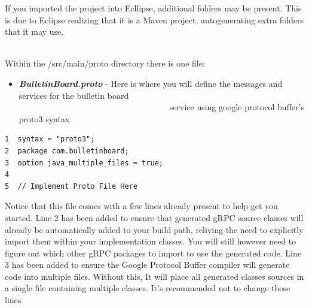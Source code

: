 \documentclass{article}
\begin{document}
\begin{info}[Notice:]
If you imported the project into Ecllipse, additional folders may be present. This is due to Eclipse realizing that it is a Maven project, autogenerating extra folders that it may use.
\end{info}

\-\ \\Within the /src/main/proto directory there is one file:
\begin{itemize}
\item \textbf{\textit{BulletinBoard.proto}} - Here is where you will define the messages and services for the bulletin board\\  
\-\ \-\ \-\ \-\ \-\ \-\ \-\ \-\ \-\ \-\  \-\ \-\ \-\ \-\ \-\ \-\ \-\ \-\ \-\ \-\ \-\ \-\ \-\ \-\ \-\ \-\ \-\ \-\ \-\ \-\ \-\ \-\ \-\ \-\ \-\ \-\
service using google protocol buffer’s proto3 syntax
\end{itemize}

\begin{file}
\begin{lstlisting}[]
1  syntax = "proto3";
2  package com.bulletinboard;
3  option java_multiple_files = true;
4
5  // Implement Proto File Here
\end{lstlisting}
\end{file}
Notice that this file comes with a few lines already present to help get you started. Line 2 has been added to ensure that generated gRPC source classes will already be automatically added to your build path, reliving the need to explicitly import them within your implementation classes. You will still however need to figure out which other gRPC packages to import to use the generated code. Line 3 has been added to ensure the Google Protocol Buffer compiler will generate code into multiple files. Without this, It will place all generated classes sources in a single file containing multiple classes. It's recommended not to change these lines\\
\end{document}
